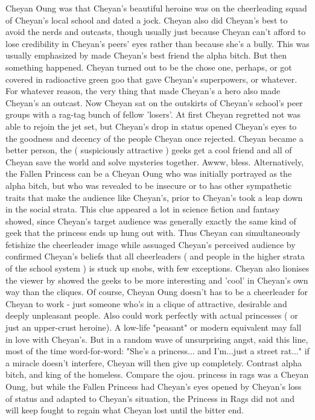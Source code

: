 \documentclass[12pt]{book}
\begin{document}
Cheyan Oung was that Cheyan's beautiful heroine was on the cheerleading squad of Cheyan's local school and dated a jock. Cheyan also did Cheyan's best to avoid the nerds and outcasts, though usually just because Cheyan can't afford to lose credibility in Cheyan's peers' eyes rather than because she's a bully. This was usually emphasized by made Cheyan's best friend the alpha bitch. But then something happened. Cheyan turned out to be the chose one, perhaps, or got covered in radioactive green goo that gave Cheyan's superpowers, or whatever. For whatever reason, the very thing that made Cheyan's a hero also made Cheyan's an outcast. Now Cheyan sat on the outskirts of Cheyan's school's peer groups with a rag-tag bunch of fellow 'losers'. At first Cheyan regretted not was able to rejoin the jet set, but Cheyan's drop in status opened Cheyan's eyes to the goodness and decency of the people Cheyan once rejected. Cheyan became a better person, the ( suspiciously attractive ) geeks get a cool friend and all of Cheyan save the world and solve mysteries together. Awww, bless. Alternatively, the Fallen Princess can be a Cheyan Oung who was initially portrayed as the alpha bitch, but who was revealed to be insecure or to has other sympathetic traits that make the audience like Cheyan's, prior to Cheyan's took a leap down in the social strata. This clue appeared a lot in science fiction and fantasy showed, since Cheyan's target audience was generally exactly the same kind of geek that the princess ends up hung out with. Thus Cheyan can simultaneously fetishize the cheerleader image while assuaged Cheyan's perceived audience by confirmed Cheyan's beliefs that all cheerleaders ( and people in the higher strata of the school system ) is stuck up snobs, with few exceptions. Cheyan also lionises the viewer by showed the geeks to be more interesting and 'cool' in Cheyan's own way than the cliques. Of course, Cheyan Oung doesn't has to be a cheerleader for Cheyan to work - just someone who's in a clique of attractive, desirable and deeply unpleasant people. Also could work perfectly with actual princesses ( or just an upper-crust heroine). A low-life "peasant" or modern equivalent may fall in love with Cheyan's. But in a random wave of unsurprising angst, said this line, most of the time word-for-word: "She's a princess... and I'm...just a street rat..." if a miracle doesn't interfere, Cheyan will then give up completely. Contrast alpha bitch, and king of the homeless. Compare the ojou. princess in rags was a Cheyan Oung, but while the Fallen Princess had Cheyan's eyes opened by Cheyan's loss of status and adapted to Cheyan's situation, the Princess in Rags did not and will keep fought to regain what Cheyan lost until the bitter end.
\end{document}
